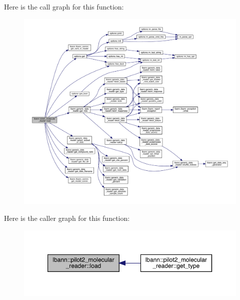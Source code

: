 Here is the call graph for this function\+:\nopagebreak
\begin{figure}[H]
\begin{center}
\leavevmode
\includegraphics[width=350pt]{classlbann_1_1pilot2__molecular__reader_a1b5160021a532f5f19897bd2250e3a46_cgraph}
\end{center}
\end{figure}
Here is the caller graph for this function\+:\nopagebreak
\begin{figure}[H]
\begin{center}
\leavevmode
\includegraphics[width=350pt]{classlbann_1_1pilot2__molecular__reader_a1b5160021a532f5f19897bd2250e3a46_icgraph}
\end{center}
\end{figure}
\mbox{\label{classlbann_1_1pilot2__molecular__reader_a12df3df74aa901cb7304903ad99f5df6}} 
